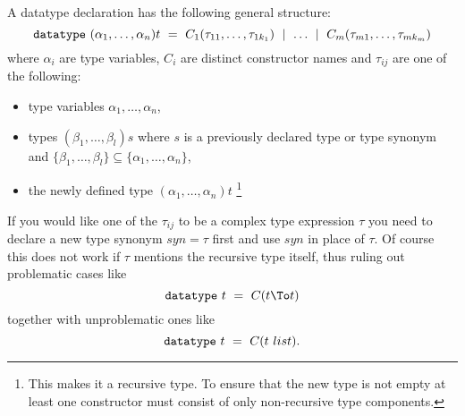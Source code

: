 A datatype declaration has the following general structure:
\[ \mbox{\tt datatype}~ (\alpha_1,\dots,\alpha_n)t ~=~
      C_1(\tau_{11},\dots,\tau_{1k_1}) ~\mid~ \dots ~\mid~
      C_m(\tau_{m1},\dots,\tau_{mk_m}) 
\]
where $\alpha_i$ are type variables, $C_i$ are distinct constructor names and
$\tau_{ij}$ are one of the following:
\begin{itemize}
\item type variables $\alpha_1,\dots,\alpha_n$,
\item types $(\beta_1,\dots,\beta_l)s$ where $s$ is a previously declared
  type or type synonym and $\{\beta_1,\dots,\beta_l\} \subseteq
  \{\alpha_1,\dots,\alpha_n\}$,
\item the newly defined type $(\alpha_1,\dots,\alpha_n)t$ \footnote{This
    makes it a recursive type. To ensure that the new type is not empty at
    least one constructor must consist of only non-recursive type
    components.}
\end{itemize}
If you would like one of the $\tau_{ij}$ to be a complex type expression
$\tau$ you need to declare a new type synonym $syn = \tau$ first and use
$syn$ in place of $\tau$. Of course this does not work if $\tau$ mentions the
recursive type itself, thus ruling out problematic cases like \[ \mbox{\tt
  datatype}~ t ~=~ C(t \To t) \] together with unproblematic ones like \[
\mbox{\tt datatype}~ t ~=~ C(t~list). \]

